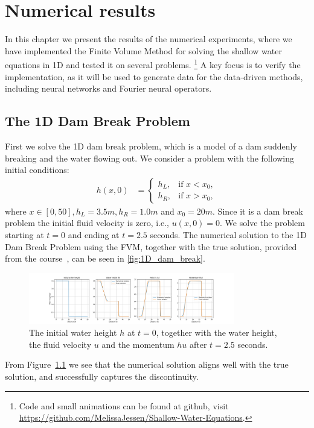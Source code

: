 \chapter{Numerical results}
In this chapter we present the results of the numerical experiments, where we have implemented the Finite Volume Method for solving the shallow water equations in 1D and tested it on several problems.
\footnote{Code and small animations can be found at github, visit \url{https://github.com/MelissaJessen/Shallow-Water-Equations}.}
A key focus is to verify the implementation, as it will be used to generate data for the data-driven methods, including neural networks and Fourier neural operators.

\section{The 1D Dam Break Problem}
First we solve the 1D dam break problem, which is a model of a dam suddenly breaking and the water flowing out.
We consider a problem with the following initial conditions:
\begin{align*}
    h(x,0) &= \begin{cases}
        h_L, & \text{if } x < x_0, \\
        h_R, & \text{if } x > x_0,
    \end{cases} 
\end{align*}
where $x \in [0,50], h_L = 3.5 m, h_R = 1.0 m$ and $x_0 = 20 m$.
Since it is a dam break problem the initial fluid velocity is zero, i.e., $u(x,0) = 0$.
We solve the problem starting at $t=0$ and ending at $t=2.5$ seconds.
The numerical solution to the 1D Dam Break Problem using the FVM, together with the true solution, provided from the course~\cite{phd_corse_2009}, can be seen in \autoref{fig:1D_dam_break}.
\begin{figure}[H]
    \centering
    \includegraphics[width=0.8\textwidth]{plots/sol_1D_val.png}
    \caption{The initial water height $h$ at $t=0$, together with the water height, the fluid velocity $u$ and the momentum $hu$ after $t=2.5$ seconds.}\label{fig:1D_dam_break}
\end{figure}
From Figure~\ref{fig:1D_dam_break} we see that the numerical solution aligns well with the true solution, and successfully captures the discontinuity.


